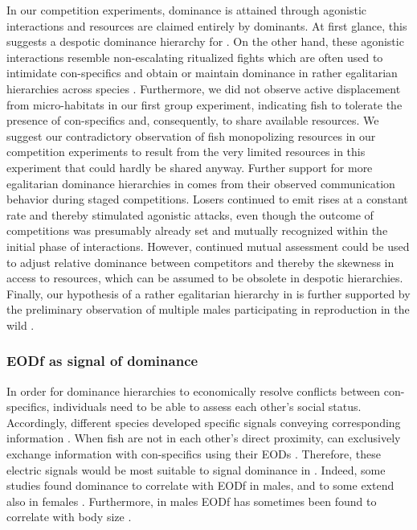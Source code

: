 In our competition experiments, dominance is attained through agonistic interactions and resources are claimed entirely by dominants. At first glance, this suggests a despotic dominance hierarchy for \lepto{} \citep{Kappeler2008}. On the other hand, these agonistic interactions resemble non-escalating ritualized fights \citep{Triefenbach2008} which are often used to intimidate con-specifics and obtain or maintain dominance in rather egalitarian hierarchies across species \citep{Sapolsky2005}. Furthermore, we did not observe active displacement from micro-habitats in our first group experiment, indicating fish to tolerate the presence of con-specifics and, consequently, to share available resources. We suggest our contradictory observation of fish monopolizing resources in our competition experiments to result from the very limited resources in this experiment that could hardly be shared anyway. Further support for more egalitarian dominance hierarchies in \lepto{} comes from their observed communication behavior during staged competitions. Losers continued to emit rises at a constant rate and thereby stimulated agonistic attacks, even though the outcome of competitions was presumably already set and mutually recognized within the initial phase of interactions. However, continued mutual assessment could be used to adjust relative dominance between competitors and thereby the skewness in access to resources, which can be assumed to be obsolete in despotic hierarchies. Finally, our hypothesis of a rather egalitarian hierarchy in \lepto{} is further supported by the preliminary observation of multiple males participating in reproduction in the wild \citep{Henninger2018}. 

\subsubsection{EODf as signal of dominance}

In order for dominance hierarchies to economically resolve conflicts between con-specifics, individuals need to be able to assess each other's social status. Accordingly, different species developed specific signals conveying corresponding information \citep{Cluttonbrock1979, Fernald2014, Cornhill2020}. When fish are not in each other's direct proximity, \lepto{} can exclusively exchange information with con-specifics using their EODs \citep{Knudsen1975, Henninger2018, Henninger2020, Benda2020}. Therefore, these electric signals would be most suitable to signal dominance in \lepto{}. Indeed, some studies found dominance to correlate with EODf in males, and to some extend also in females \citep{Hagedorn1985, Dunlap2002, Triefenbach2008}. Furthermore, in males EODf has sometimes been found to correlate with body size \citep{Dunlap2002, Triefenbach2008}. 

